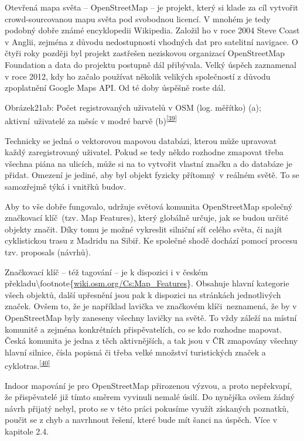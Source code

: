 Otevřená mapa světa -- OpenStreetMap -- je projekt, který si klade za cíl vytvořit crowd-sourcovanou mapu světa pod svobodnou licencí. V mnohém je tedy podobný dobře známé encyklopedii Wikipedia. Založil ho v roce 2004 Steve Coast v Anglii, zejména z důvodu nedostupnosti vhodných dat pro satelitní navigace. O čtyři roky později byl projekt zastřešen neziskovou organizací OpenStreetMap Foundation a data do projektu postupně dál přibývala. Velký úspěch zaznamenal v roce 2012, kdy ho začalo používat několik velikých společností z důvodu zpoplatnění Google Maps API. Od té doby úspěšně roste dál.

Obrázek21ab: Počet registrovaných uživatelů v OSM (log. měřítko) (a); aktivní~uživatelé za měsíc v modré barvě (b)\textsuperscript{\href{}{{[}39{]}}}

Technicky se jedná o vektorovou mapovou databázi, kterou může upravovat každý zaregistrovaný uživatel. Pokud se tedy někdo rozhodne zmapovat třeba všechna piána na ulicích, může si na to vytvořit vlastní značku a do databáze je přidat. Omezení je jediné, aby byl objekt fyzicky přítomný~v reálném světě. To se samozřejmě týká i vnitřků budov.

Aby to vše dobře fungovalo, udržuje světová komunita OpenStreetMap společný značkovací klíč~(tzv. Map Features), který globálně určuje, jak se budou určité objekty značit. Díky tomu je možné vykreslit silniční síť celého světa, či najít cyklistickou trasu z Madridu na Sibiř. Ke společné shodě dochází pomocí procesu tzv. proposals (návrhů).

Značkovací klíč -- též tagování -- je k dispozici i v českém překladu\textbackslash{}footnote\{\href{}{wiki.osm.org/Cs:Map\_Features}\}. Obsahuje hlavní kategorie všech objektů, další upřesnění jsou pak k dispozici na stránkách jednotlivých značek. Ovšem to, že je například lavička ve značkovém klíči~neznamená, že by v OpenStreetMap byly zaneseny všechny lavičky na světě. To vždy záleží na místní komunitě a zejména konkrétních přispěvatelích, co se kdo rozhodne mapovat. Česká komunita je jedna z těch aktivnějších, a tak jsou v ČR zmapovány všechny hlavní silnice, čísla popisná či třeba velké množství turistických značek a cyklotras.\textsuperscript{\href{}{{[}40{]}}}

Indoor mapování je pro OpenStreetMap přirozenou výzvou, a proto nepřekvapí, že přispěvatelé již tímto směrem vyvinuli nemalé úsilí. Do nynějška ovšem žádný návrh přijatý nebyl, proto se v této práci pokusíme využít získaných poznatků, poučit se z chyb a navrhnout řešení, které bude mít šanci na úspěch. Více v kapitole 2.4.

